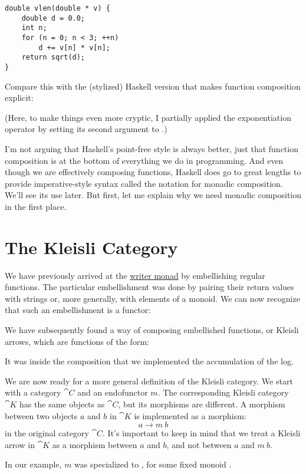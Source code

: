 \begin{Verbatim}
double vlen(double * v) {
    double d = 0.0;
    int n;
    for (n = 0; n < 3; ++n)
        d += v[n] * v[n];
    return sqrt(d);
}
\end{Verbatim}
Compare this with the (stylized) Haskell version that makes function
composition explicit:

(Here, to make things even more cryptic, I partially applied the
exponentiation operator \code{(\^{})} by setting its second argument
to .)

I'm not arguing that Haskell's point-free style is always better, just
that function composition is at the bottom of everything we do in
programming. And even though we are effectively composing functions,
Haskell does go to great lengths to provide imperative-style syntax
called the  notation for monadic composition. We'll see its
use later. But first, let me explain why we need monadic composition in
the first place.

\section{The Kleisli Category}

We have previously arrived at the
\hyperref[kleisli-categories]{writer
monad} by embellishing regular functions. The particular embellishment
was done by pairing their return values with strings or, more generally,
with elements of a monoid. We can now recognize that such an embellishment
is a functor:

We have subsequently found a way of composing embellished functions, or
Kleisli arrows, which are functions of the form:

It was inside the composition that we implemented the accumulation of
the log.

We are now ready for a more general definition of the Kleisli category.
We start with a category $\cat{C}$ and an endofunctor $m$. The
corresponding Kleisli category $\cat{K}$ has the same objects as
$\cat{C}$, but its morphisms are different. A morphism between two
objects $a$ and $b$ in $\cat{K}$ is implemented as a
morphism:
\[a \to m\ b\]
in the original category $\cat{C}$. It's important to keep in mind that
we treat a Kleisli arrow in $\cat{K}$ as a morphism between $a$
and $b$, and not between $a$ and $m\ b$.

In our example, $m$ was specialized to , for
some fixed monoid .

